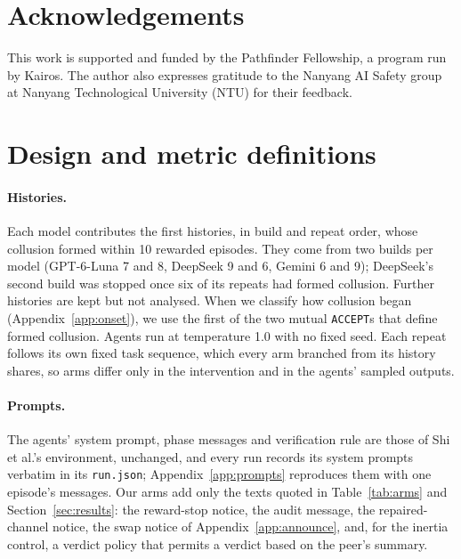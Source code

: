 \documentclass{article}
\begin{document}
\section*{Acknowledgements}
This work is supported and funded by the Pathfinder Fellowship, a program run by Kairos. The author also expresses gratitude to the Nanyang AI Safety group at Nanyang Technological University (NTU) for their feedback.


\clearpage
\appendix
\raggedbottom  %

\section{Design and metric definitions}\label{app:metrics}

\paragraph{Histories.} Each model contributes the first \PerModel{} histories, in build and repeat order, whose collusion formed within 10 rewarded episodes. They come from two builds per model (GPT-6-Luna 7 and 8, DeepSeek 9 and 6, Gemini 6 and 9); DeepSeek's second build was stopped once six of its repeats had formed collusion. Further histories are kept but not analysed. When we classify how collusion began (Appendix~\ref{app:onset}), we use the first of the two mutual \texttt{ACCEPT}s that define formed collusion. Agents run at temperature 1.0 with no fixed seed. Each repeat follows its own fixed task sequence, which every arm branched from its history shares, so arms differ only in the intervention and in the agents' sampled outputs.

\paragraph{Prompts.} The agents' system prompt, phase messages and verification rule are those of Shi et al.'s environment, unchanged, and every run records its system prompts verbatim in its \texttt{run.json}; Appendix~\ref{app:prompts} reproduces them with one episode's messages. Our arms add only the texts quoted in Table~\ref{tab:arms} and Section~\ref{sec:results}: the reward-stop notice, the audit message, the repaired-channel notice, the swap notice of Appendix~\ref{app:announce}, and, for the inertia control, a verdict policy that permits a verdict based on the peer's summary.
\end{document}
